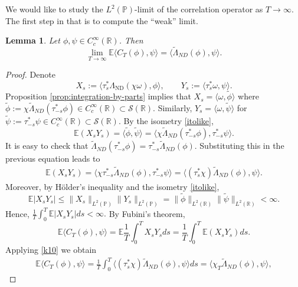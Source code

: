 \documentclass[10pt,a4paper]{article}
\theoremstyle{plain}
\newtheorem{lemma}[theorem]{Lemma}
\theoremstyle{definition}
\theoremstyle{remark}
\numberwithin{equation}{section}
\newcommand{\R}{\mathbb{R}}
\newcommand{\E}{\mathbb{E}} %
\newcommand{\ND}{\Lambda_{\text{ND}}}
\begin{document}
We would like to study the $L^2(\mathbb{P})$-limit of the correlation operator as $T \to \infty$. 
The first step in that is to compute the ``weak'' limit. 

 \begin{lemma}\label{weaklemma}
 Let $\phi , \psi \in C^\infty_c(\R)$. Then 
\[ \lim_{T \to \infty} \E \langle     C_T ( \phi) , \psi \rangle = \langle  \tilde\Lambda_{ND} (\phi  ) ,   \psi   \rangle.
\]
 \end{lemma}
 
 \begin{proof}
Denote
  \begin{equation}
    X_s := \langle \tau_s^* \ND (\chi \omega ), \phi  \rangle, \qquad Y_s := \langle \tau_s^* \omega, \psi \rangle.
  \end{equation}
Proposition \ref{prop:integration-by-parts} implies that 
$
X_s =  \langle  \omega , \tilde\phi \rangle$ where $ \tilde\phi := \chi  \tilde\Lambda_{ND} (\tau_{-s}^* \phi ) \in C^\infty_c(\R) \subset \mathcal{S}(\R). $
Similarly, $Y_s = \langle \omega, \tilde\psi \rangle$ for $\tilde\psi:= \tau_{-s}^* \psi \in C^\infty_c(\R) \subset \mathcal{S}(\R) $. 
By the isometry \eqref{itolike},
\[
 \E (X_s Y_s) = \langle \tilde\phi , \tilde\psi \rangle =\langle  \chi  \tilde\Lambda_{ND} ( \tau_{-s}^*\phi  ),   \tau_{-s}^*\psi  \rangle .    
\]
It is easy to check that  $\tilde\Lambda_{ND} ( \tau_{-s}^* \phi ) =   \tau_{-s}^*\tilde\Lambda_{ND} (\phi)$. Substituting this in the previous equation leads to 
\begin{align}
 \E (X_s Y_s) =\langle  \chi  \tau_{-s}^* \tilde\Lambda_{ND} (\phi  ) ,  \tau_{-s}^*   \psi  \rangle   = \langle  ( \tau_{s}^* \chi  )   \tilde\Lambda_{ND} (\phi  ) ,   \psi  \rangle. 
 \label{k10}
 \end{align}
 Moreover, by Hölder's inequality and  the isometry \eqref{itolike}, 
 \[
  \E |X_s Y_s| \leq  \| X_s \|_{L^2(\mathbb{P})}  \| Y_s \|_{L^2(\mathbb{P})} =   \| \tilde\phi \|_{L^2(\R)}  \| \tilde\psi  \|_{L^2(\R)} < \infty. 
 \]
 Hence, $\frac{1}{T} \int_0^T  \E  |X_s Y_s|  ds < \infty.$
By Fubini's theorem,
 \[
\E \langle C_T ( \phi) ,\psi \rangle = \E  \frac{1}{T}  \int_0^T   X_s Y_s ds  = \frac{1}{T}  \int_0^T    \E (X_s Y_s)  ds .
\]
Applying \eqref{k10} we obtain 
\begin{align}
\E \langle C_T ( \phi) ,\psi \rangle =  \frac{1}{T}  \int_0^T    \langle  ( \tau_{s}^* \chi  )   \tilde\Lambda_{ND} (\phi  ) ,   \psi  \rangle ds  =     \langle   \chi_T  \tilde\Lambda_{ND} (\phi  ) ,   \psi   \rangle ,\label{wooq}
\end{align}

\end{proof}
\end{document}

